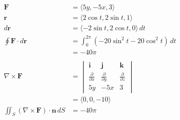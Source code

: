 \documentclass{article}
\begin{document}
\subsubsection{}

\begin{align*}
  \mathbf{F}                                               & = \langle 5 y, -5 x, 3 \rangle                                                            \\
  \mathbf{r}                                               & = \langle 2 \cos t, 2 \sin t, 1 \rangle                                                   \\
  d \mathbf{r}                                             & = \langle -2 \sin t, 2 \cos t, 0 \rangle \,dt                                             \\
  \oint \mathbf{F} \cdot d \mathbf{r}                      & = \int_0^{2 \pi} (-20 \sin^2 t - 20 \cos^2 t) \,dt                                        \\
                                                           & = -40 \pi                                                                                 \\ \\
  \nabla \times \mathbf{F}                                 & = \begin{vmatrix}
                                                                 \mathbf{i}                  & \mathbf{j}                  & \mathbf{k}                  \\
                                                                 \frac{\partial}{\partial x} & \frac{\partial}{\partial y} & \frac{\partial}{\partial z} \\
                                                                 5 y                         & -5 x                        & 3
                                                               \end{vmatrix} \\
                                                           & = \langle 0, 0, -10 \rangle                                                               \\
  \iint_S (\nabla \times \mathbf{F}) \cdot \mathbf{n} \,dS & = -40 \pi
\end{align*}

\setcounter{subsubsection}{4}
\subsubsection{}
\end{document}
